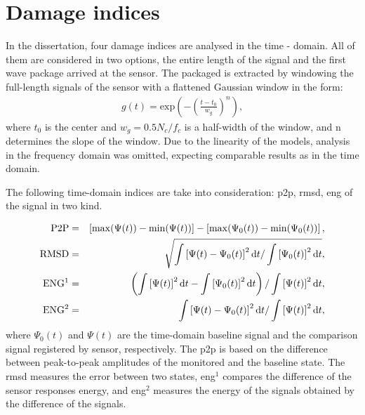 \section{Damage indices}
\label{sec:di}

In the dissertation, four damage indices are analysed in the time - domain. All of them are considered in two options, the entire length of the signal and the first wave package arrived at the sensor.
The packaged is extracted by windowing the full-length signals of the sensor  with a flattened Gaussian window in the form:
\begin{eqnarray}
	g(t)= \mathrm{exp}\left(-\left(\frac{t-t_0}{w_g}\right) ^{n}\right),
	\label{eq:psi_g}
\end{eqnarray}
where \(t_0\) is the center and \(w_g=0.5N_c/f_c\) is a half-width of the window, and n determines the slope of the window.
Due to the linearity of the models, analysis in the frequency domain was omitted, expecting comparable results as in the time domain.

The following time-domain indices are take into consideration: \ac{p2p}, \ac{rmsd}, \ac{eng} of the signal in two kind.

\begin{eqnarray}
		\mathrm{P2P} & = & \left[\mathrm{max}(\Psi(t)) - \mathrm{min}(\Psi(t))\right] - \left[\mathrm{max}(\Psi_0(t)) - \mathrm{min}(\Psi_0(t))\right],\\
		\mathrm{RMSD} & = & \sqrt{\int{\left[\Psi(t)-\Psi_0(t)\right]^2\mathop{}\!\mathrm{d}t/\int{\left[\Psi_0(t)\right]^2\mathop{}\!\mathrm{d}t}}},\\
		\mathrm{ENG^1} & = & \left(\int{\left[\Psi(t)\right]^2\mathop{}\!\mathrm{d}t}-\int{\left[\Psi_0(t)\right]^2\mathop{}\!\mathrm{d}t}\right) /\int{\left[\Psi(t)\right]^2\mathop{}\!\mathrm{d}t},\\
		\mathrm{ENG^2} & = & \int{\left[\Psi(t)-\Psi_0(t)\right]^2\mathop{}\!\mathrm{d}t}/\int{\left[\Psi(t)\right]^2\mathop{}\!\mathrm{d}t},\\
\end{eqnarray}
where \(\Psi_0(t)\) and \(\Psi(t)\) are the time-domain baseline
signal and the comparison signal registered by sensor, respectively.
The \ac{p2p} is based on the difference between peak-to-peak amplitudes of the monitored and the baseline state.
The \ac{rmsd} measures the error between two states, \ac{eng}\(^1\) compares the difference of the sensor responses energy, and \ac{eng}\(^2\) measures the energy of the signals obtained by the difference of the signals.

